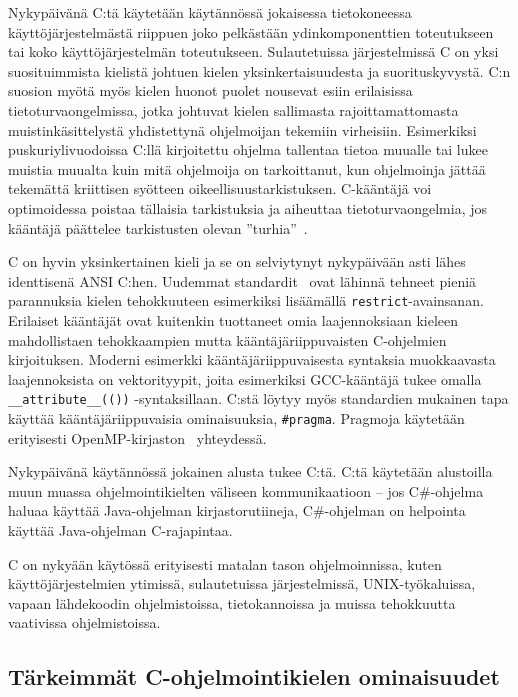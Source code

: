 \grayrule

Nykypäivänä C:tä käytetään käytännössä jokaisessa tietokoneessa
käyttöjärjestelmästä riippuen joko pelkästään ydinkomponenttien toteutukseen
tai koko käyttöjärjestelmän toteutukseen. Sulautetuissa järjestelmissä C on
yksi suosituimmista kielistä johtuen kielen yksinkertaisuudesta ja
suorituskyvystä. C:n suosion myötä myös kielen huonot puolet nousevat esiin
erilaisissa tietoturvaongelmissa, jotka johtuvat kielen sallimasta
rajoittamattomasta muistinkäsittelystä yhdistettynä ohjelmoijan tekemiin
virheisiin. Esimerkiksi puskuriylivuodoissa C:llä kirjoitettu ohjelma tallentaa
tietoa muualle tai lukee muistia muualta kuin mitä ohjelmoija on tarkoittanut,
kun ohjelmoinja jättää tekemättä kriittisen syötteen oikeellisuustarkistuksen.
C-kääntäjä voi optimoidessa poistaa tällaisia tarkistuksia ja aiheuttaa
tietoturvaongelmia, jos kääntäjä päättelee tarkistusten olevan
''turhia''~\citep{redhatsecurity}.

C on hyvin yksinkertainen kieli ja se on selviytynyt nykypäivään asti lähes
identtisenä ANSI C:hen. Uudemmat standardit~\citep{C99, C11, C18} ovat lähinnä
tehneet pieniä parannuksia kielen tehokkuuteen esimerkiksi lisäämällä
\texttt{restrict}-avainsanan. Erilaiset kääntäjät ovat kuitenkin tuottaneet
omia laajennoksiaan kieleen mahdollistaen tehokkaampien mutta
kääntäjäriippuvaisten C-ohjelmien kirjoituksen. Moderni esimerkki
kääntäjäriippuvaisesta syntaksia muokkaavasta laajennoksista on vektorityypit,
joita esimerkiksi GCC-kääntäjä tukee omalla \texttt{\_\_attribute\_\_(())}
-syntaksillaan. C:stä löytyy myös standardien mukainen tapa käyttää
kääntäjäriippuvaisia ominaisuuksia, \texttt{\#pragma}. Pragmoja käytetään
erityisesti OpenMP-kirjaston~\citep{openmp} yhteydessä.

Nykypäivänä käytännössä jokainen alusta tukee C:tä. C:tä käytetään alustoilla
muun muassa ohjelmointikielten väliseen kommunikaatioon -- jos C\#-ohjelma
haluaa käyttää Java-ohjelman kirjastorutiineja, C\#-ohjelman on helpointa
käyttää Java-ohjelman C-rajapintaa.

C on nykyään käytössä erityisesti matalan tason ohjelmoinnissa, kuten
käyttöjärjestelmien ytimissä, sulautetuissa järjestelmissä, UNIX-työkaluissa,
vapaan lähdekoodin ohjelmistoissa, tietokannoissa ja muissa tehokkuutta
vaativissa ohjelmistoissa.

\subsection{Tärkeimmät C-ohjelmointikielen ominaisuudet}
\label{sec:cominaisuudet}

